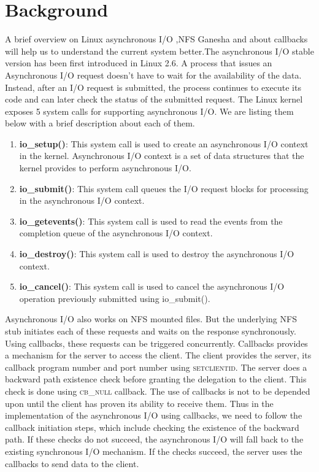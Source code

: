\section{Background}
\label{bg}

A brief overview on Linux asynchronous I/O ,NFS Ganesha and about callbacks will help us to understand the current system better.The asynchronous I/O stable version has been first introduced in Linux 2.6. A process that issues an Asynchronous I/O request doesn't have to wait for the availability of the data. Instead, after an I/O request is submitted, the process continues to execute its code and can later check the status of the submitted request. The Linux kernel exposes 5 system calls \cite{kernelCode} for supporting asynchronous I/O. We are listing them below with a brief description about each of them.

\begin{enumerate}

\item{\textbf{io\_setup()}: This system call is used to create an asynchronous I/O context in the kernel. Asynchronous I/O context is a set of data structures that the kernel provides to perform asynchronous I/O.}

\item{\textbf{io\_submit()}: This system call queues the I/O request blocks for processing in the asynchronous I/O context.}

\item{\textbf{io\_getevents()}: This system call is used to read the events from the completion queue of the asynchronous I/O context.}

\item{\textbf{io\_destroy()}: This system call is used to destroy the asynchronous I/O context.}

\item{\textbf{io\_cancel()}: This system call is used to cancel the asynchronous I/O operation previously submitted using io\_submit().}

\end{enumerate}

Asynchronous I/O also works on NFS mounted files. But the underlying NFS stub initiates each of these requests and waits on the response synchronously. Using callbacks, these requests can be triggered concurrently. Callbacks provides a mechanism for the server to access the client. The client provides the server, its callback program number and port number using \textsc{setclientid}. The server does a backward path existence check before granting the delegation to the client. This check is done using \textsc{cb\_null} callback. The use of callbacks is not to be depended upon until the client has proven its ability to receive them. Thus in the implementation of the asynchronous I/O using callbacks, we need to follow the callback initiation steps, which include checking the existence of the backward path. If these checks do not succeed, the asynchronous I/O will fall back to the existing synchronous I/O mechanism. If the checks succeed, the server uses the callbacks to send data to the client.

